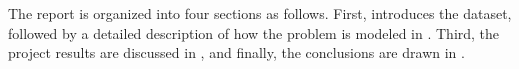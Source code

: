 The report is organized into four sections as follows. First,  introduces the dataset, followed by a detailed description of how the problem is modeled in . Third, the project results are discussed in , and finally, the conclusions are drawn in .